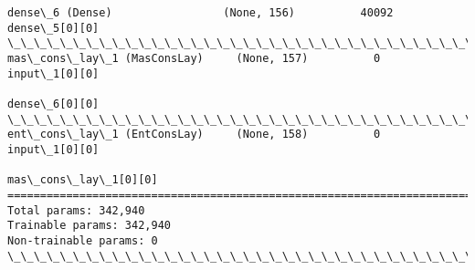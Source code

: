 \documentclass[11pt]{article}
\begin{document}
\begin{Verbatim}[commandchars=\\\{\}]
dense\_6 (Dense)                 (None, 156)          40092       dense\_5[0][0]                    
\_\_\_\_\_\_\_\_\_\_\_\_\_\_\_\_\_\_\_\_\_\_\_\_\_\_\_\_\_\_\_\_\_\_\_\_\_\_\_\_\_\_\_\_\_\_\_\_\_\_\_\_\_\_\_\_\_\_\_\_\_\_\_\_\_\_\_\_\_\_\_\_\_\_\_\_\_\_\_\_\_\_\_\_\_\_\_\_\_\_\_\_\_\_\_\_\_\_
mas\_cons\_lay\_1 (MasConsLay)     (None, 157)          0           input\_1[0][0]                    
                                                                 dense\_6[0][0]                    
\_\_\_\_\_\_\_\_\_\_\_\_\_\_\_\_\_\_\_\_\_\_\_\_\_\_\_\_\_\_\_\_\_\_\_\_\_\_\_\_\_\_\_\_\_\_\_\_\_\_\_\_\_\_\_\_\_\_\_\_\_\_\_\_\_\_\_\_\_\_\_\_\_\_\_\_\_\_\_\_\_\_\_\_\_\_\_\_\_\_\_\_\_\_\_\_\_\_
ent\_cons\_lay\_1 (EntConsLay)     (None, 158)          0           input\_1[0][0]                    
                                                                 mas\_cons\_lay\_1[0][0]             
==================================================================================================
Total params: 342,940
Trainable params: 342,940
Non-trainable params: 0
\_\_\_\_\_\_\_\_\_\_\_\_\_\_\_\_\_\_\_\_\_\_\_\_\_\_\_\_\_\_\_\_\_\_\_\_\_\_\_\_\_\_\_\_\_\_\_\_\_\_\_\_\_\_\_\_\_\_\_\_\_\_\_\_\_\_\_\_\_\_\_\_\_\_\_\_\_\_\_\_\_\_\_\_\_\_\_\_\_\_\_\_\_\_\_\_\_\_

    \end{Verbatim}
\end{document}
